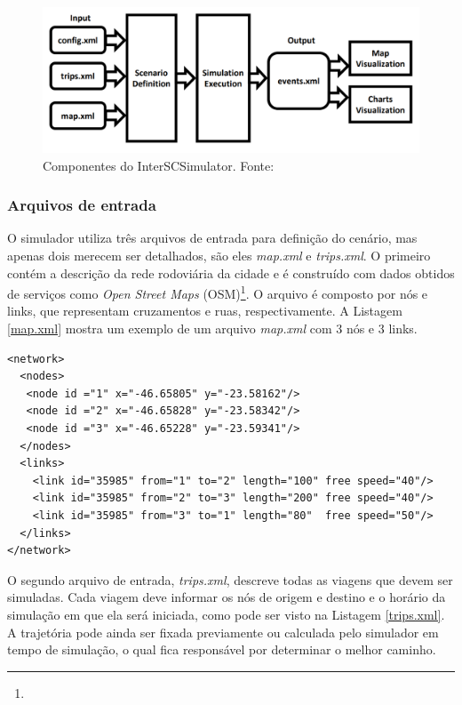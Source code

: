 \begin{figure}[!htb]
  \centering
  \includegraphics[width=160mm]{../figuras/interscsimulator.png}
  \caption{Componentes do InterSCSimulator. Fonte: \citet{mabs2017} \label{fig:interscsimulator}}
\end{figure}

\subsubsection{Arquivos de entrada}
  O simulador utiliza três arquivos de entrada para definição do cenário, mas
apenas dois merecem ser detalhados, são eles \emph{map.xml} e \emph{trips.xml}.
O primeiro  contém a descrição da rede rodoviária da cidade e é construído com
dados obtidos de serviços como \emph{Open Street Maps}
(OSM)\footnote{}. O arquivo é composto por nós e
links, que representam cruzamentos e ruas, respectivamente. A Listagem
\ref{map.xml} mostra um exemplo de um arquivo \emph{map.xml} com 3 nós e 3
links.

\begin{lstlisting}[style=myxml, caption={Exemplo de arquivo map.xml que define a rede rodoviária da cidade. Fonte: \citet{mabs2017}}, label=map.xml]
<network>
  <nodes>
   <node id ="1" x="-46.65805" y="-23.58162"/>
   <node id ="2" x="-46.65828" y="-23.58342"/>
   <node id ="3" x="-46.65228" y="-23.59341"/>
  </nodes>
  <links>
    <link id="35985" from="1" to="2" length="100" free speed="40"/>
    <link id="35985" from="2" to="3" length="200" free speed="40"/>
    <link id="35985" from="3" to="1" length="80"  free speed="50"/>
  </links>
</network>
\end{lstlisting}

  O segundo arquivo de entrada, \emph{trips.xml}, descreve todas as viagens que devem ser
simuladas. Cada viagem deve informar os nós de origem e destino e o horário da
simulação em que ela será iniciada, como pode ser visto na Listagem
\ref{trips.xml}. A trajetória pode ainda ser fixada previamente ou calculada
pelo simulador em tempo de simulação, o qual fica responsável por determinar o
melhor caminho.

